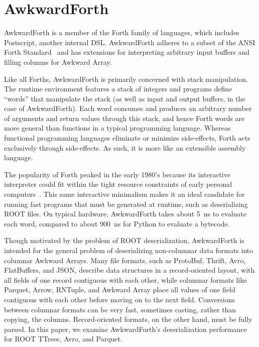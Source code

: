 \documentclass{webofc}
\begin{document}
\section{AwkwardForth}

AwkwardForth is a member of the Forth family of languages, which includes Postscript, another internal DSL. AwkwardForth adheres to a subset of the ANSI Forth Standard~\cite{forth-standard} and has extensions for interpreting arbitrary input buffers and filling columns for Awkward Array.

Like all Forths, AwkwardForth is primarily concerned with stack manipulation. The runtime environment features a stack of integers and programs define ``words'' that manipulate the stack (as well as input and output buffers, in the case of AwkwardForth). Each word consumes and produces an arbitrary number of arguments and return values through this stack, and hence Forth words are more general than functions in a typical programming language. Whereas functional programming languages eliminate or minimize side-effects, Forth acts exclusively through side-effects. As such, it is more like an extensible assembly language.

The popularity of Forth peaked in the early 1980's because its interactive interpreter could fit within the tight resource constraints of early personal computers~\cite{forth}. This same interactive minimalism makes it an ideal candidate for running fast programs that must be generated at runtime, such as deserializing ROOT files. On typical hardware, AwkwardForth takes about 5~ns to evaluate each word, compared to about 900~ns for Python to evaluate a bytecode.

Though motivated by the problem of ROOT deserialization, AwkwardForth is intended for the general problem of deserializing non-columnar data formats into columnar Awkward Arrays. Many file formats, such as ProtoBuf, Thrift, Avro, FlatBuffers, and JSON, describe data structures in a record-oriented layout, with all fields of one record contiguous with each other, while columnar formats like Parquet, Arrow, RNTuple, and Awkward Array place all values of one field contiguous with each other before moving on to the next field. Conversions between columnar formats can be very fast, sometimes casting, rather than copying, the columns. Record-oriented formats, on the other hand, must be fully parsed. In this paper, we examine AwkwardForth's deserialization performance for ROOT TTrees, Avro, and Parquet.
\end{document}
